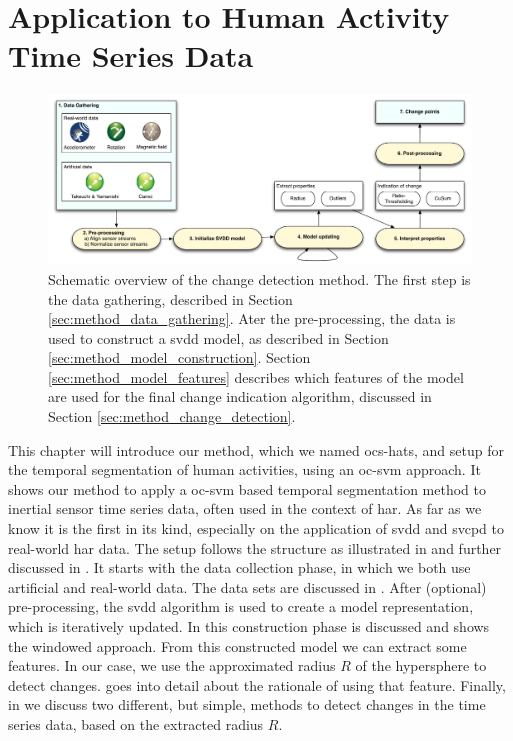 
\chapter{Application to Human Activity Time Series Data}

\label{Chapter4} %


\begin{figure}
  \centering
    \includegraphics[width=\textwidth]{./Figures/chapter4/method_setup.pdf}
  \caption[Method setup]{Schematic overview of the change detection method. The first step is the data gathering, described in Section \ref{sec:method_data_gathering}. Ater the pre-processing, the data is used to construct a \gls{svdd} model, as described in Section \ref{sec:method_model_construction}. Section \ref{sec:method_model_features} describes which features of the model are used for the final change indication algorithm, discussed in Section \ref{sec:method_change_detection}.}
  \label{fig:method_overview}
\end{figure}

This chapter will introduce our method, which we named \gls{ocs-hats}, and setup for the temporal segmentation of human activities, using an \gls{oc-svm} approach.
It shows our method to apply a \gls{oc-svm} based temporal segmentation method to inertial sensor time series data, often used in the context of \acrlong{har}.
As far as we know it is the first in its kind, especially on the application of \gls{svdd} and \gls{svcpd} to real-world \gls{har} data.
The setup follows the structure as illustrated in  and further discussed in .
It starts with the data collection phase, in which we both use artificial and real-world data.
The data sets are discussed in .
After (optional) pre-processing, the \gls{svdd} algorithm is used to create a model representation, which is iteratively updated.
In  this construction phase is discussed and shows the windowed approach.
From this constructed model we can extract some features.
In our case, we use the approximated radius $R$ of the hypersphere to detect changes.
 goes into detail about the rationale of using that feature.
Finally, in  we discuss two different, but simple, methods to detect changes in the time series data, based on the extracted radius $R$.





